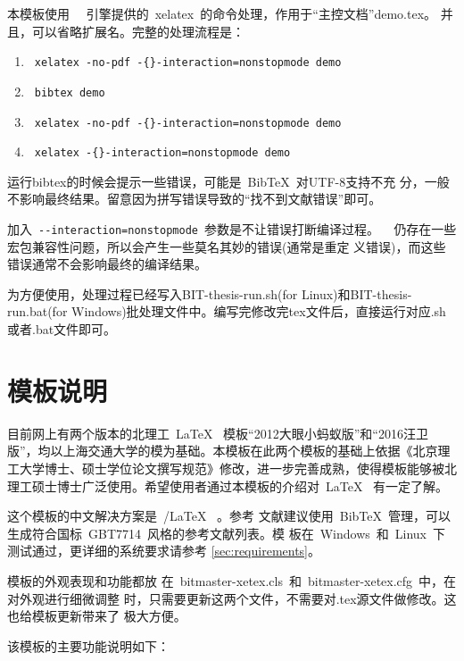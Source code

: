 本模板使用~\XeTeX~ 引擎提供的~xelatex~的命令处理，作用于“主控文档”demo.tex。
并且，可以省略扩展名。完整的处理流程是：

{\color{blue}
\begin{enumerate}
\item[] ~\verb|xelatex -no-pdf -{}-interaction=nonstopmode demo|
\item[] ~\verb|bibtex demo| 
\item[] ~\verb|xelatex -no-pdf -{}-interaction=nonstopmode demo|
\item[] ~\verb|xelatex -{}-interaction=nonstopmode demo|
\end{enumerate}}

运行bibtex的时候会提示一些错误，可能是~{{\sc Bib}\TeX}~对UTF-8支持不充
分，一般不影响最终结果。留意因为拼写错误导致的``找不到文献错误''即可。

加入~\verb|--interaction=nonstopmode|~参数是不让错误打断编译过程。
\XeTeX~ 仍存在一些宏包兼容性问题，所以会产生一些莫名其妙的错误(通常是重定
义错误)，而这些错误通常不会影响最终的编译结果。
  
为方便使用，处理过程已经写入BIT-thesis-run.sh(for Linux)和BIT-thesis-run.bat(for Windows)批处理文件中。编写完修改完tex文件后，直接运行对应.sh或者.bat文件即可。

\section{模板说明}
\label{sec:features}
 
目前网上有两个版本的北理工~\LaTeX~ 模板“2012大眼小蚂蚁版”和“2016汪卫版”，均以上海交通大学的模为基础。本模板在此两个模板的基础上依据《北京理工大学博士、硕士学位论文撰写规范》修改，进一步完善成熟，使得模板能够被北理工硕士博士广泛使用。希望使用者通过本模板的介绍对~\LaTeX~ 有一定了解。

这个模板的中文解决方案是~\XeTeX/\LaTeX~ 。参考
文献建议使用~BibTeX~管理，可以生成符合国标~GBT7714~风格的参考文献列表。模
板在~Windows~和~Linux~下测试通过，更详细的系统要求请参考
\ref{sec:requirements}。

模板的外观表现和功能都放
在~bitmaster-xetex.cls~和~bitmaster-xetex.cfg~中，在对外观进行细微调整
时，只需要更新这两个文件，不需要对.tex源文件做修改。这也给模板更新带来了
极大方便。

该模板的主要功能说明如下：

